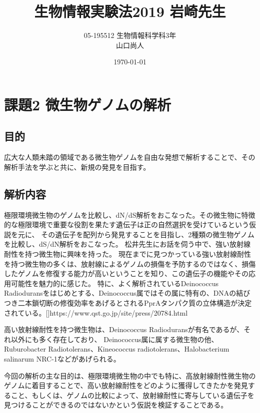 \documentclass[a4j,12pt]{jreport}
\title{生物情報実験法2019 岩崎先生}
\author{05-195512 生物情報科学科3年 \\ 山口尚人}
\date{\today}
\begin{document}
\maketitle




\chapter{課題2 微生物ゲノムの解析}

\section{目的}
広大な人類未踏の領域である微生物ゲノムを自由な発想で解析することで、その解析手法を学ぶと共に、新規の発見を目指す。

\section{解析内容}
極限環境微生物のゲノムを比較し、dN/dS解析をおこなった。その微生物に特徴的な極限環境で重要な役割を果たす遺伝子は正の自然選択を受けているという仮説を元に、
その遺伝子を配列から発見することを目指し、2種類の微生物ゲノムを比較し、dS/dN解析をおこなった。
松井先生にお話を伺う中で、強い放射線耐性を持つ微生物に興味を持った。
現在までに見つかっている強い放射線耐性を持つ微生物の多くは、放射線によるゲノムの損傷を予防するのではなく、損傷したゲノムを修復する能力が高いということを知り、この遺伝子の機能やその応用可能性を魅力的に感じた。
特に、よく解析されているDeinococcus Radioduransをはじめとする、Deinococcus属ではその属に特有の、DNAの結びつき二本鎖切断の修復効率をあげるとされるPprAタンパク質の立体構造が決定されている。[]https://www.qst.go.jp/site/press/20784.html

高い放射線耐性を持つ微生物は、Deinococcus Radioduransが有名であるが、それ以外にも多く存在しており、
Deinococcus属に属する微生物の他、Ruburobacter Radiotolerans、Kineococcus radiotolerans、Halobacterium salinarum NRC-1などがあげられる。

今回の解析の主な目的は、極限環境微生物の中でも特に、高放射線耐性微生物のゲノムに着目することで、高い放射線耐性をどのように獲得してきたかを発見すること、もしくは、ゲノムの比較によって、放射線耐性に寄与している遺伝子を見つけることができるのではないかという仮説を検証することである。
\end{document}
